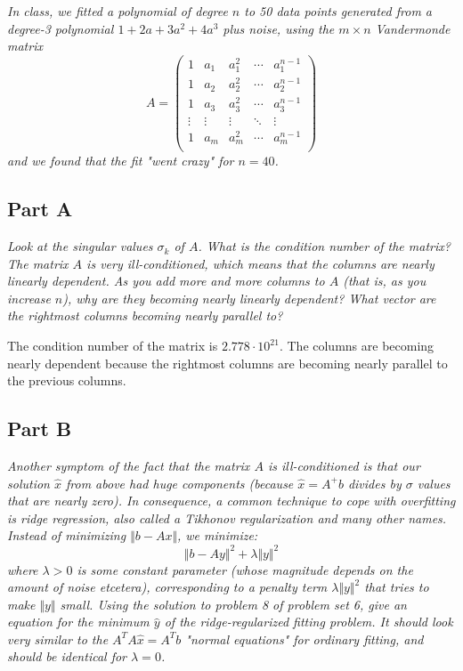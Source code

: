 \documentclass{article}
\begin{document}
\textit{In class, we fitted a polynomial of degree $n$ to 50 data points
generated from a degree-3 polynomial $1 + 2a + 3a^2 + 4a^3$ plus noise, using
the $m \times n$ Vandermonde matrix}
$$ A = \begin{pmatrix}
  1 & a_1 & a_1^2 & \cdots & a_1^{n-1} \\
  1 & a_2 & a_2^2 & \cdots & a_2^{n-1} \\
  1 & a_3 & a_3^2 & \cdots & a_3^{n-1} \\
  \vdots & \vdots & \vdots & \ddots & \vdots \\
  1 & a_m & a_m^2 & \cdots & a_m^{n-1} \\
\end{pmatrix} $$
\textit{and we found that the fit "went crazy" for $n=40$.}

\subsection*{Part A}

\textit{Look at the singular values $\sigma_k$ of $A$. What is the condition
number of the matrix? The matrix $A$ is very ill-conditioned, which means
that the columns are nearly linearly dependent. As you add more and more
columns to $A$ (that is, as you increase $n$), why are they becoming nearly
linearly dependent? What vector are the rightmost columns becoming nearly
parallel to?}

\bigbreak

The condition number of the matrix is $2.778 \cdot 10^{21}$. The columns are
becoming nearly dependent because the rightmost columns are becoming nearly
parallel to the previous columns.

\subsection*{Part B}

\textit{Another symptom of the fact that the matrix $A$ is ill-conditioned is
that our solution $\hat{x}$ from above had huge components (because $\hat{x}
= A^+ b$ divides by $\sigma$ values that are nearly zero). In consequence, a
common technique to cope with overfitting is ridge regression, also called a
Tikhonov regularization and many other names. Instead of minimizing
$\Vert b - Ax \Vert$, we minimize:}
$$ \Vert b - Ay \Vert^2 + \lambda \Vert y \Vert^2 $$
\textit{where $\lambda > 0$ is some constant parameter (whose magnitude
depends on the amount of noise etcetera), corresponding to a penalty term
$\lambda \Vert y \Vert^2$ that tries to make $\Vert y \Vert$ small. Using the
solution to problem 8 of problem set 6, give an equation for the minimum
$\hat{y}$ of the ridge-regularized fitting problem. It should look very
similar to the $A^T A \hat{x} = A^T b$ "normal equations" for ordinary
fitting, and should be identical for $\lambda = 0$.}
\end{document}
